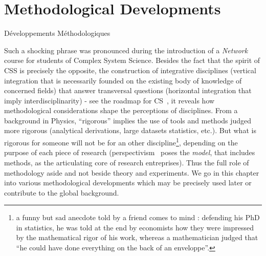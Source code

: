 



\chapter{Methodological Developments}{Développements Méthodologiques} %

\label{ch:methodology} %



\bigskip

Such a shocking phrase 
was pronounced during the introduction of a \emph{Network} course for students of Complex System Science. Besides the fact that the spirit of CSS 
 is precisely the opposite, {\ie} the construction of integrative disciplines (vertical integration that is necessarily founded on the existing body of knowledge of concerned fields) that answer transversal questions (horizontal integration that imply interdisciplinarity) - see {\eg} the roadmap for CS~\cite{2009arXiv0907.2221B}, it reveals how methodological considerations shape the perceptions of disciplines. From a background in Physics, 
 ``rigorous'' implies the use of tools and methods judged more rigorous (analytical derivations, large datasets statistics, etc.).
  But what is rigorous for someone will not be for an other discipline\footnote{a funny but sad anecdote told by a friend comes to mind : defending his PhD in statistics, he was told at the end by economists how they were impressed by the mathematical rigor of his work, whereas a mathematician judged that ``he could have done everything on the back of an enveloppe''.}, depending on the purpose of each piece of research (perspectivism~\cite{giere2010scientific} poses the \emph{model}, that includes methods, as the articulating core of research entreprises). Thus the full role of methodology aside and not beside theory and experiments. We go in this chapter into various methodological developments which may be precisely used later or contribute to the global background.



